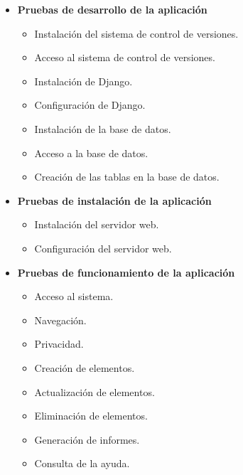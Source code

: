  \begin{itemize}

  \item \textbf{Pruebas de desarrollo de la aplicación}
  \begin{itemize}
   \item Instalación del sistema de control de versiones.
   \item Acceso al sistema de control de versiones.
   \item Instalación de Django.
   \item Configuración de Django.
   \item Instalación de la base de datos.
   \item Acceso a la base de datos.
   \item Creación de las tablas en la base de datos.
  \end{itemize}

  \item \textbf{Pruebas de instalación de la aplicación}
  \begin{itemize}
   \item Instalación del servidor web.
   \item Configuración del servidor web.
  \end{itemize}

  \item \textbf{Pruebas de funcionamiento de la aplicación}
  \begin{itemize}
   \item Acceso al sistema.
   \item Navegación.
   \item Privacidad.
   \item Creación de elementos.
   \item Actualización de elementos.
   \item Eliminación de elementos.
   \item Generación de informes.
   \item Consulta de la ayuda.
  \end{itemize}

 \end{itemize}
